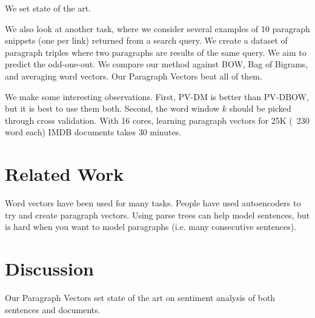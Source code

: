 \documentclass[a4paper]{article}
\begin{document}
We set state of the art.

We also look at another task, where we consider several examples of
10 paragraph snippets (one per link) returned from a search query. We create
a dataset of paragraph triples where two paragraphs are results of the same
query. We aim to predict the odd-one-out. We compare our method against BOW,
Bag of Bigrams, and averaging word vectors. Our Paragraph Vectors beat all of
them.

We make some interesting observations. First, PV-DM is better than PV-DBOW,
but it is best to use them both. Second, the word window $k$ should be picked
through cross validation. With 16 cores, learning paragraph vectors for
25K (~230 word each) IMDB documents takes 30 minutes.

\section{Related Work}
Word vectors have been used for many tasks. People have used autoencoders to
try and create paragraph vectors. Using parse trees can help model sentences,
but is hard when you want to model paragraphs (i.e. many consecutive sentences).

\section{Discussion}
Our Paragraph Vectors set state of the art on sentiment analysis of both
sentences and documents.
\end{document}
